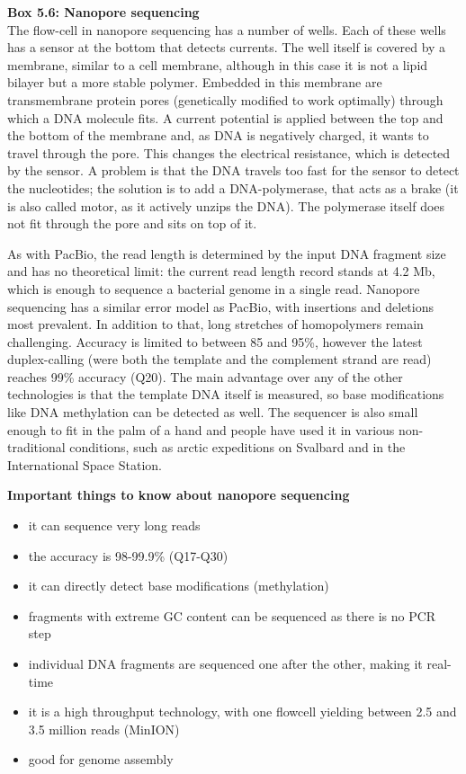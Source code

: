 \begin{framed}
\textbf{Box 5.6: Nanopore sequencing}\\
The flow-cell in nanopore sequencing has a number
of wells. Each of these wells has a sensor at the bottom that detects
currents. The well itself is covered by a membrane, similar to a cell
membrane, although in this case it is not a lipid bilayer but a more stable
polymer. Embedded in this membrane are transmembrane protein pores
(genetically modified to work optimally) through which a DNA molecule fits.
A current potential is applied between the top and the bottom of the
membrane and, as DNA is negatively charged, it wants to travel through the
pore. This changes the electrical resistance, which is detected by the
sensor. A problem is that the DNA travels too fast for the sensor to detect
the nucleotides; the solution is to add a DNA-polymerase, that acts as a
brake (it is also called motor, as it actively unzips the DNA).
The polymerase itself does not fit through the pore and sits on top of it.

As with PacBio, the read length is determined by the input DNA fragment size
and has no theoretical limit: the current read length record stands at 4.2
Mb, which is enough to sequence a bacterial genome in a single read. Nanopore
sequencing has a similar error model as PacBio, with insertions and
deletions most prevalent. In addition to that, long stretches of homopolymers
remain challenging. Accuracy is limited to between 85 and 95\%, however the latest
duplex-calling (were both the template and the complement strand are read) reaches
99\% accuracy (Q20). The main advantage over any of the other
technologies is that the template DNA itself is measured, so base
modifications like DNA methylation can be detected as well. The sequencer
is also small enough to fit in the palm of a hand and people have used it in various
non-traditional conditions, such as arctic expeditions on Svalbard and in
the International Space Station.
\end{framed}

\begin{framed}
\textbf{Important things to know about nanopore sequencing}\\
\begin{itemize}
\item it can sequence very long reads
\item the accuracy is 98-99.9\% (Q17-Q30)
\item it can directly detect base modifications (methylation)
\item fragments with extreme GC content can be sequenced as there is no PCR step
\item individual DNA fragments are sequenced one after the other, making it real-time
\item it is a high throughput technology, with one flowcell yielding between 2.5 and 3.5 million reads (MinION)
\item good for genome assembly
\end{itemize}
\end{framed}

